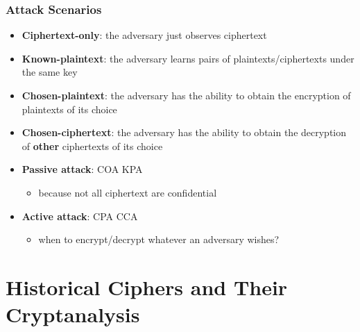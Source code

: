\begin{frame}\frametitle{Attack Scenarios}	
\begin{itemize}
\item \textbf{Ciphertext-only}: the adversary just observes ciphertext
\item \textbf{Known-plaintext}: the adversary learns pairs of plaintexts/ciphertexts under the same key
\item \textbf{Chosen-plaintext}: the adversary has the ability to obtain the encryption of plaintexts of its choice
\item \textbf{Chosen-ciphertext}: the adversary has the ability to obtain the decryption of \textbf{other} ciphertexts of its choice
\item \textbf{Passive attack}: COA KPA
\begin{itemize}
\item because not all ciphertext are confidential
\end{itemize}
\item \textbf{Active attack}: CPA CCA
\begin{itemize}
\item when to encrypt/decrypt whatever an adversary wishes?
\end{itemize}
\end{itemize}	
\end{frame}
\section{Historical Ciphers and Their Cryptanalysis}

